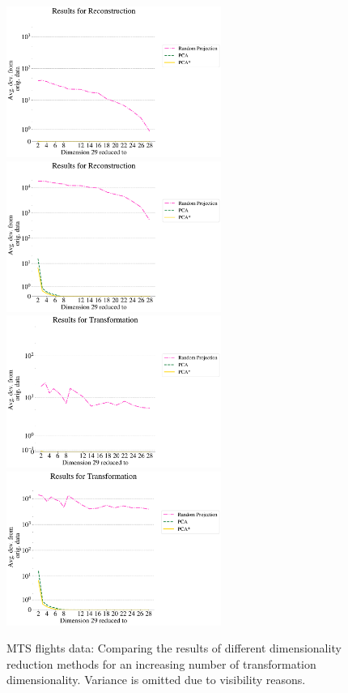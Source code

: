 \documentclass[pdftex,12pt,a4paper]{report}
\begin{document}
\begin{figure}[htb!]
    \includegraphics[width=7cm]{./images/real-world/flights/avg_dev_vs_dyn_low/reconstructed_10lines_4660points_euclidean.pdf}
    \includegraphics[width=7cm]{./images/real-world/flights/avg_dev_vs_dyn_low/reconstructed_10lines_4660points_multiple_scalar_product.pdf}
    \includegraphics[width=7cm]{./images/real-world/flights/avg_dev_vs_dyn_low/transformed_10lines_4660points_euclidean.pdf}
    \includegraphics[width=7cm]{./images/real-world/flights/avg_dev_vs_dyn_low/transformed_10lines_4660points_multiple_scalar_product.pdf}
    \caption{MTS flights data: Comparing the results of different dimensionality reduction methods for an increasing number of transformation dimensionality. Variance is omitted due to visibility reasons.} \label{fig:avg_dev_vs_low_dim-flights}
\end{figure}
\end{document}
